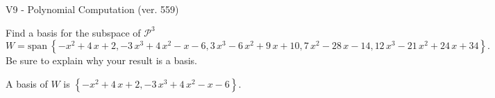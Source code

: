 \begin{exercise}
  \begin{exerciseTitle}V9 - Polynomial Computation (ver. 559)\end{exerciseTitle}
  \begin{exerciseStatement}
    Find a basis for the subspace of \(\mathcal{P}^3\) 
\[W=\mathrm{span}\ \left\{-x^{2} + 4 \, x + 2 , -3 \, x^{3} + 4 \, x^{2} - x - 6 , 3 \, x^{3} - 6 \, x^{2} + 9 \, x + 10 , 7 \, x^{2} - 28 \, x - 14 , 12 \, x^{3} - 21 \, x^{2} + 24 \, x + 34\right\}.\]
 Be sure to explain why your result is a basis.


  \end{exerciseStatement}
  \begin{exerciseAnswer}
   A basis of \(W\) is  \(\left\{-x^{2} + 4 \, x + 2 , -3 \, x^{3} + 4 \, x^{2} - x - 6\right\}\).
  


  \end{exerciseAnswer}
\end{exercise}